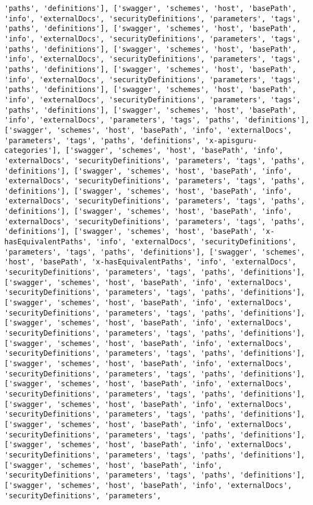 \documentclass[11pt]{article}
\begin{document}
\begin{Verbatim}[commandchars=\\\{\}]
'paths', 'definitions'], ['swagger', 'schemes', 'host', 'basePath', 'info', 'externalDocs', 'securityDefinitions', 'parameters', 'tags', 'paths', 'definitions'], ['swagger', 'schemes', 'host', 'basePath', 'info', 'externalDocs', 'securityDefinitions', 'parameters', 'tags', 'paths', 'definitions'], ['swagger', 'schemes', 'host', 'basePath', 'info', 'externalDocs', 'securityDefinitions', 'parameters', 'tags', 'paths', 'definitions'], ['swagger', 'schemes', 'host', 'basePath', 'info', 'externalDocs', 'securityDefinitions', 'parameters', 'tags', 'paths', 'definitions'], ['swagger', 'schemes', 'host', 'basePath', 'info', 'externalDocs', 'securityDefinitions', 'parameters', 'tags', 'paths', 'definitions'], ['swagger', 'schemes', 'host', 'basePath', 'info', 'externalDocs', 'parameters', 'tags', 'paths', 'definitions'], ['swagger', 'schemes', 'host', 'basePath', 'info', 'externalDocs', 'parameters', 'tags', 'paths', 'definitions', 'x-apisguru-categories'], ['swagger', 'schemes', 'host', 'basePath', 'info', 'externalDocs', 'securityDefinitions', 'parameters', 'tags', 'paths', 'definitions'], ['swagger', 'schemes', 'host', 'basePath', 'info', 'externalDocs', 'securityDefinitions', 'parameters', 'tags', 'paths', 'definitions'], ['swagger', 'schemes', 'host', 'basePath', 'info', 'externalDocs', 'securityDefinitions', 'parameters', 'tags', 'paths', 'definitions'], ['swagger', 'schemes', 'host', 'basePath', 'info', 'externalDocs', 'securityDefinitions', 'parameters', 'tags', 'paths', 'definitions'], ['swagger', 'schemes', 'host', 'basePath', 'x-hasEquivalentPaths', 'info', 'externalDocs', 'securityDefinitions', 'parameters', 'tags', 'paths', 'definitions'], ['swagger', 'schemes', 'host', 'basePath', 'x-hasEquivalentPaths', 'info', 'externalDocs', 'securityDefinitions', 'parameters', 'tags', 'paths', 'definitions'], ['swagger', 'schemes', 'host', 'basePath', 'info', 'externalDocs', 'securityDefinitions', 'parameters', 'tags', 'paths', 'definitions'], ['swagger', 'schemes', 'host', 'basePath', 'info', 'externalDocs', 'securityDefinitions', 'parameters', 'tags', 'paths', 'definitions'], ['swagger', 'schemes', 'host', 'basePath', 'info', 'externalDocs', 'securityDefinitions', 'parameters', 'tags', 'paths', 'definitions'], ['swagger', 'schemes', 'host', 'basePath', 'info', 'externalDocs', 'securityDefinitions', 'parameters', 'tags', 'paths', 'definitions'], ['swagger', 'schemes', 'host', 'basePath', 'info', 'externalDocs', 'securityDefinitions', 'parameters', 'tags', 'paths', 'definitions'], ['swagger', 'schemes', 'host', 'basePath', 'info', 'externalDocs', 'securityDefinitions', 'parameters', 'tags', 'paths', 'definitions'], ['swagger', 'schemes', 'host', 'basePath', 'info', 'externalDocs', 'securityDefinitions', 'parameters', 'tags', 'paths', 'definitions'], ['swagger', 'schemes', 'host', 'basePath', 'info', 'externalDocs', 'securityDefinitions', 'parameters', 'tags', 'paths', 'definitions'], ['swagger', 'schemes', 'host', 'basePath', 'info', 'externalDocs', 'securityDefinitions', 'parameters', 'tags', 'paths', 'definitions'], ['swagger', 'schemes', 'host', 'basePath', 'info', 'securityDefinitions', 'parameters', 'tags', 'paths', 'definitions'], ['swagger', 'schemes', 'host', 'basePath', 'info', 'externalDocs', 'securityDefinitions', 'parameters', 
\end{Verbatim}
\end{document}
